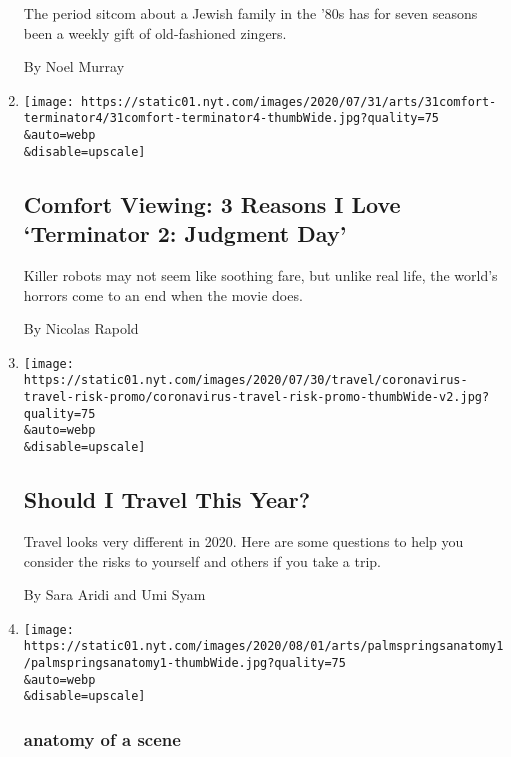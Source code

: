 \begin{enumerate}
  The period sitcom about a Jewish family in the '80s has for seven
  seasons been a weekly gift of old-fashioned zingers.

  By Noel Murray
\item
  \href{/2020/07/31/movies/comfort-viewing-terminator-2.html}{}

  \texttt{[image: https://static01.nyt.com/images/2020/07/31/arts/31comfort-terminator4/31comfort-terminator4-thumbWide.jpg?quality=75\\\&auto=webp\\\&disable=upscale]}

  \hypertarget{comfort-viewing-3-reasons-i-love-terminator-2-judgment-day-1}{%
  \subsection{Comfort Viewing: 3 Reasons I Love `Terminator 2: Judgment
  Day'}\label{comfort-viewing-3-reasons-i-love-terminator-2-judgment-day-1}}

  Killer robots may not seem like soothing fare, but unlike real life,
  the world's horrors come to an end when the movie does.

  By Nicolas Rapold
\item
  \href{/interactive/2020/07/31/travel/coronavirus-travel-risk.html}{}

  \texttt{[image: https://static01.nyt.com/images/2020/07/30/travel/coronavirus-travel-risk-promo/coronavirus-travel-risk-promo-thumbWide-v2.jpg?quality=75\\\&auto=webp\\\&disable=upscale]}

  \hypertarget{should-i-travel-this-year}{%
  \subsection{Should I Travel This
  Year?}\label{should-i-travel-this-year}}

  Travel looks very different in 2020. Here are some questions to help
  you consider the risks to yourself and others if you take a trip.

  By Sara Aridi and Umi Syam
\item
  \href{/2020/07/31/movies/palm-springs-clip-hulu.html}{}

  \texttt{[image: https://static01.nyt.com/images/2020/08/01/arts/palmspringsanatomy1/palmspringsanatomy1-thumbWide.jpg?quality=75\\\&auto=webp\\\&disable=upscale]}

  \hypertarget{anatomy-of-a-scene}{%
  \subsubsection{anatomy of a scene}\label{anatomy-of-a-scene}}


\end{enumerate}
